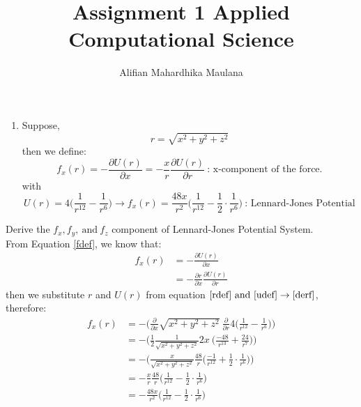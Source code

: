 \documentclass[a4paper,12pt]{article}
\title{Assignment 1 Applied Computational Science}
\author{Alifian Mahardhika Maulana}
\begin{document}
\maketitle
\begin{enumerate}
	\item Suppose,
	\begin{equation}\label{rdef}
	r=\sqrt{x^2+y^2+z^2}
	\end{equation}
	then we define:
	\begin{equation}\label{fdef}
	f_x(r)=-\frac{\partial U(r)}{\partial x} = -\frac{x}{r} \frac{\partial U(r)}{\partial r}\ \text{: x-component of the force.}
	\end{equation}
	with
	\begin{equation}\label{udef}
	U(r) = 4 \bigg(\frac{1}{r^{12}}-\frac{1}{r^6}\bigg) \longrightarrow f_x(r) = \frac{48x}{r^2}\bigg(\frac{1}{r^{12}}-\frac{1}{2}\cdot\frac{1}{r^6}\bigg)\ \text{: Lennard-Jones Potential}
	\end{equation}
\end{enumerate}
Derive the $f_x,f_y,\ \text{and}\ f_z$ component of Lennard-Jones Potential System.\\
\newline
From Equation \eqref{fdef}, we know that:
\begin{equation}\label{derf}
\begin{aligned}
f_x(r) &=-\frac{\partial U(r)}{\partial x}\\
&= -\frac{\partial r}{\partial x}\frac{\partial U(r)}{\partial r}
\end{aligned}
\end{equation}
then we substitute $r$ and $U(r)$ from equation $\eqref{rdef}\ \text{and}\ \eqref{udef} \rightarrow\eqref{derf}$, therefore:
\begin{equation}
\begin{aligned}
f_x(r) &= - \bigg( \frac{\partial}{\partial x} \sqrt{x^2+y^2+z^2}\ \frac{\partial}{\partial r} 4 \bigg(\frac{1}{r^{12}}-\frac{1}{r^6}\bigg) \bigg) \\
&= - \bigg( \frac{1}{2} \frac{1}{\sqrt{x^2+y^2+z^2}}2x\ \bigg( \frac{-48}{r^{13}}+\frac{24}{r^7} \bigg) \bigg)\\
&= - \bigg( \frac{x}{\sqrt{x^2+y^2+z^2}} \frac{48}{r} \bigg( \frac{-1}{r^{12}}+\frac{1}{2} \cdot \frac{1}{r^6} \bigg) \bigg)\\
&= - \frac{x}{r} \frac{48}{r} \bigg( \frac{1}{r^{12}}-\frac{1}{2} \cdot \frac{1}{r^6} \bigg)\\
&= - \frac{48x}{r^2} \bigg( \frac{1}{r^{12}}-\frac{1}{2} \cdot \frac{1}{r^6} \bigg)\\
\end{aligned}
\end{equation}
\end{document}
